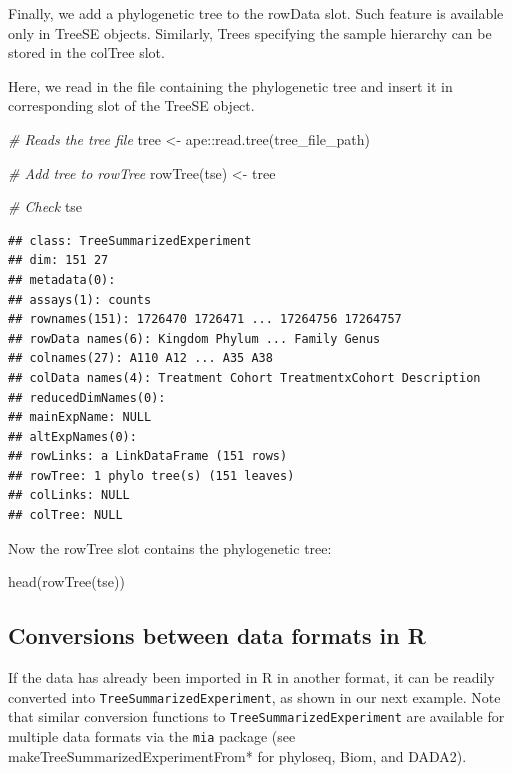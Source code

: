 \documentclass[
]{book}
\newenvironment{Shaded}{\begin{snugshade}}{\end{snugshade}}
\newcommand{\CommentTok}[1]{\textcolor[rgb]{0.56,0.35,0.01}{\textit{#1}}}
\newcommand{\FunctionTok}[1]{\textcolor[rgb]{0.00,0.00,0.00}{#1}}
\newcommand{\NormalTok}[1]{#1}
\newcommand{\OtherTok}[1]{\textcolor[rgb]{0.56,0.35,0.01}{#1}}
\newcommand{\SpecialCharTok}[1]{\textcolor[rgb]{0.00,0.00,0.00}{#1}}
\begin{document}
Finally, we add a phylogenetic tree to the rowData slot. Such feature is available only in TreeSE objects. Similarly, Trees specifying the sample hierarchy can be stored in the colTree slot.

Here, we read in the file containing the phylogenetic tree and insert it in corresponding slot of the TreeSE object.

\begin{Shaded}
\begin{Highlighting}[]
\CommentTok{\# Reads the tree file}
\NormalTok{tree }\OtherTok{\textless{}{-}}\NormalTok{ ape}\SpecialCharTok{::}\FunctionTok{read.tree}\NormalTok{(tree\_file\_path)}

\CommentTok{\# Add tree to rowTree}
\FunctionTok{rowTree}\NormalTok{(tse) }\OtherTok{\textless{}{-}}\NormalTok{ tree}

\CommentTok{\# Check}
\NormalTok{tse}
\end{Highlighting}
\end{Shaded}

\begin{verbatim}
## class: TreeSummarizedExperiment 
## dim: 151 27 
## metadata(0):
## assays(1): counts
## rownames(151): 1726470 1726471 ... 17264756 17264757
## rowData names(6): Kingdom Phylum ... Family Genus
## colnames(27): A110 A12 ... A35 A38
## colData names(4): Treatment Cohort TreatmentxCohort Description
## reducedDimNames(0):
## mainExpName: NULL
## altExpNames(0):
## rowLinks: a LinkDataFrame (151 rows)
## rowTree: 1 phylo tree(s) (151 leaves)
## colLinks: NULL
## colTree: NULL
\end{verbatim}

Now the rowTree slot contains the phylogenetic tree:

\begin{Shaded}
\begin{Highlighting}[]
\FunctionTok{head}\NormalTok{(}\FunctionTok{rowTree}\NormalTok{(tse))}
\end{Highlighting}
\end{Shaded}

\hypertarget{conversions-between-data-formats-in-r}{%
\subsection{Conversions between data formats in R}\label{conversions-between-data-formats-in-r}}

If the data has already been imported in R in another format, it
can be readily converted into \texttt{TreeSummarizedExperiment}, as shown in our next
example. Note that similar conversion functions to
\texttt{TreeSummarizedExperiment} are available for multiple data formats via
the \texttt{mia} package (see makeTreeSummarizedExperimentFrom* for phyloseq,
Biom, and DADA2).
\end{document}
